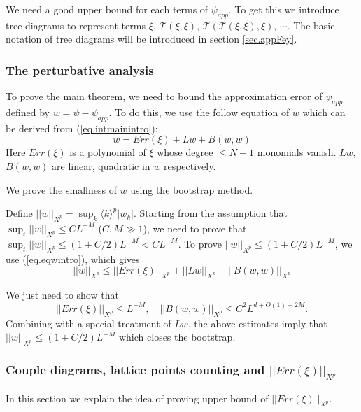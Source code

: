 We need a good upper bound for each terms of $\psi_{app}$. To get this we introduce tree diagrams to represent terms $\xi$, $\mathcal{T}(\xi,\xi)$, $\mathcal{T}(\mathcal{T}(\xi,\xi),\xi)$, $\cdots$. The basic notation of tree diagrams will be introduced in section \ref{sec.appFey}.

\subsubsection{The perturbative analysis}\label{sec.pert intro} To prove the main theorem, we need to bound the approximation error of $\psi_{app}$ defined by $w=\psi-\psi_{app}$. To do this, we use the follow equation of $w$ which can be derived from (\ref{eq.intmainintro}):
\begin{equation}\label{eq.eqwintro}
    w= Err(\xi)+Lw+B(w,w)
\end{equation}
Here $Err(\xi)$ is a polynomial of $\xi$ whose degree $\le N+1$ monomials vanish. $Lw$, $B(w,w)$ are linear, quadratic in $w$ respectively.

We prove the smallness of $w$ using the bootstrap method.

Define $||w||_{X^p}=\sup_{k} \langle k\rangle^{p} |w_k|$. Starting from the assumption that $\sup_t||w||_{X^p}\le CL^{-M}$ ($C,M\gg 1$), we need to prove that $\sup_t||w||_{X^p}\le (1+C/2)L^{-M}<CL^{-M}$. To prove $||w||_{X^p}\le (1+C/2)L^{-M}$, we use (\ref{eq.eqwintro}), which gives
\begin{equation}\label{eq.ineqw}
    ||w||_{X^p}\le ||Err(\xi)||_{X^p}+||Lw||_{X^p}+||B(w,w)||_{X^p}
\end{equation}

We just need to show that 
\begin{equation}
    ||Err(\xi)||_{X^p}\le L^{-M},
    \quad ||B(w,w)||_{X^p}\le C^2L^{d+O(1)-2M}.
\end{equation}
Combining with a special treatment of $Lw$, the above estimates imply that $||w||_{X^p}\le (1+C/2)L^{-M}$ which closes the bootstrap.


\subsubsection{Couple diagrams, lattice points counting and $||Err(\xi)||_{X^p}$}\label{sec.latticeintro} In this section we explain the idea of proving upper bound of $||Err(\xi)||_{X^p}$.

